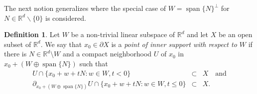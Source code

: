 \documentclass[a4paper,10pt]{amsart}
\newtheorem*{crucial lemma}{Lemma \ref{lem:nice polynomial2}}
\theoremstyle{definition}
\newtheorem{definition}[theorem]{Definition}
\newcommand{\R}{\mathbb{R}}
\begin{document}
The next notion generalizes \cite[Definition 3.9]{MTV1990} where the special case of $W=\operatorname{span}\{N\}^\perp$ for $N\in\R^d\backslash\{0\}$ is considered.

\begin{definition}\label{def: inner support}
	Let $W$ be a non-trivial linear subspace of $\R^d$ and let $X$ be an open subset of $\R^d$. We say that $x_0\in\partial X$ is a \emph{point of inner support with respect to $W$} if there is $N\in\R^d\setminus W$ and a compact neighborhood $U$ of $x_0$ in $x_0+(W\oplus\operatorname{span}\{N\})$  such that
    \begin{eqnarray*}
        U\cap\{x_0+w+tN\colon w\in W, t<0\}&\subset& X \quad\text{and}\\
		\partial_{x_0+(W\oplus\operatorname{span}\{N\})} U\cap\{x_0+w+tN\colon w\in W, t\leq 0\}&\subset& X.
    \end{eqnarray*}
\end{definition}
\end{document}
